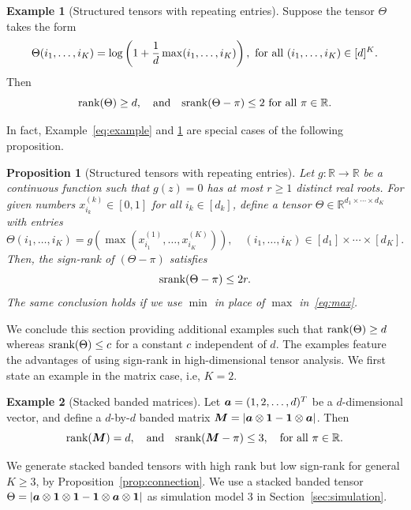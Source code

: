 \documentclass[twoside,11pt]{article}
\theoremstyle{plain}
\newtheorem{prop}{Proposition}
\theoremstyle{definition}
\newtheorem{example}{Example}
\def\srank{\textup{srank}}
\def\rank{\textup{rank}}
\begin{document}
\begin{example}[Structured tensors with repeating entries]\label{example:max} Suppose the tensor $\Theta$ takes the form 
\[
\Theta(i_1,\ldots,i_K)=\log\left(1+{1\over d}\max(i_1,\ldots,i_K)\right), \ \text{for all }(i_1,\ldots,i_K)\in[d]^K.
\]
 Then 
 \[
 \rank(\Theta)\geq d, \quad \text{and}\quad \srank(\Theta-\pi)\leq 2\ \text{for all }\pi\in\mathbb{R}. 
 \]
\end{example}
In fact, Example~\ref{eq:example} and \ref{example:max} are  special cases of the following proposition. 

\begin{prop}[Structured tensors with repeating entries]\label{prop:repeat}Let $g\colon \mathbb{R}\to \mathbb{R}$ be a continuous function such that $g(z)=0$ has at most $r\geq 1$ distinct real roots. For given numbers $x^{(k)}_{i_k}\in[0,1]$ for all $i_k\in[d_k]$, define a tensor $\Theta\in\mathbb{R}^{d_1\times\cdots \times d_K}$ with entries 
\begin{equation}\label{eq:max}
\Theta(i_1,\ldots,i_K)=g(\max(x^{(1)}_{i_1},\ldots,x^{(K)}_{i_K})),\quad (i_1,\ldots,i_K)\in[d_1]\times\cdots\times[d_K].
\end{equation}
Then, the sign-rank of $(\Theta-\pi)$ satisfies
\[
\srank(\Theta-\pi)\leq 2r.
\]
The same conclusion holds if we use $\min$ in place of $\max$ in~\eqref{eq:max}. 
\end{prop}


We conclude this section providing additional examples such that $\rank(\Theta)\geq d$ whereas $\srank(\Theta)\leq c$ for a constant $c$ independent of $d$. The examples feature the advantages of using sign-rank in high-dimensional tensor analysis. We first state an example in the matrix case, i.e, $K=2$. 


\begin{example}[Stacked banded matrices]\label{example:banded} Let $\bm{a}=(1,2,\ldots,d)^T$ be a $d$-dimensional vector, and define a $d$-by-$d$ banded matrix $\bm M=|\bm{a}\otimes \mathbf{1}-\mathbf{1}\otimes \bm{a}|$. Then
\[
\rank(\mM)=d,\quad \text{and}\quad \srank(\mM-\pi)\leq 3, \quad \text{for all }\pi\in \mathbb{R}.
\]
\end{example}

We generate stacked banded tensors with high rank but low sign-rank for general $K\geq 3$, by Proposition~\ref{prop:connection}. We use a stacked banded tensor $\Theta=|\bm{a}\otimes\mathbf{1}\otimes \mathbf{1}-\mathbf{1}\otimes\bm{a}\otimes \mathbf{1}|$ as simulation model 3 in Section~\ref{sec:simulation}.  
\end{document}
